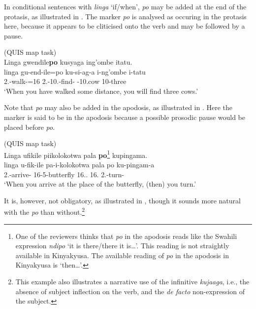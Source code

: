 \documentclass[output=paper]{langscibook}
\begin{document}
\z


In conditional sentences with \textit{linga} ‘if/when’, \textit{po} may be added at the end of the protasis, as illustrated in . The marker \textit{po} is analysed as occuring in the protasis here, because it appears to be cliticised onto the verb and may be followed by a pause.

\ea
\label{bkm:Ref122427981}
(QUIS map task)\\
Linga gwendile\textbf{po} kusyaga ing’ombe itatu.\\
\gll
linga  gu-end-ile=po  ku-si-ag-a  i-ng’ombe  i-tatu\\
\COND{}  2\SG.\SM{}-walk-\PFV{}=16  2\SG.\SM{}-10.\OM-find-\FV{}  \AUG{}-10.cow  10-three\\
\glt
‘When you have walked some distance, you will find three cows.’\\

\z


Note that \textit{po} may also be added in the apodosis, as illustrated in . Here the marker is said to be in the apodosis because a possible prosodic pause would be placed before \textit{po}.

\ea
\label{bkm:Ref122427969}
(QUIS map task)\\
Linga ufikile piikolokotwa pala \textbf{po}\footnote{One of the reviewers thinks that \textit{po} in the apodosis reads like the Swahili expression \textit{ndipo} ‘it is there/there it is…’. This reading is not straightly available in Kinyakyusa. The available reading of \textit{po} in the apodosis in Kinyakyusa is ‘then…’.} kupingama.\\
\gll
linga  u-fik-ile  pa-i-kolokotwa  pala  po ku-pingam-a\\
\COND{}  2\SG.\SM{}-arrive-\PFV{}  16-5-butterfly  16.\DEM{}.\DIST{}  16.\PRO{} 2\SG.\SM{}-turn-\FV{}\\
\glt ‘When you arrive at the place of the butterfly, (then) you turn.’

\z

It is, however, not obligatory, as illustrated in , though it sounds more natural with the \textit{po} than without.\footnote{This example also illustrates a narrative use of the infinitive \textit{kujaaga}, i.e., the absence of subject inflection on the verb, and the \textit{de facto} non-expression of the subject.}
\end{document}
